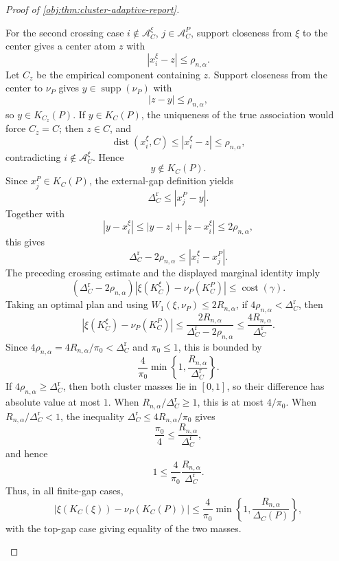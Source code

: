 \begin{proof}[Proof of \cref{obj:thm:cluster-adaptive-report}]
\begin{enumerate}
For the second crossing case \(i\notin\mathscr A_C^\xi\),
\(j\in\mathscr A_C^P\), support closeness from \(\xi\) to the center gives a
center atom \(z\) with
\[
|x_i^\xi-z|\le\rho_{n,\alpha}.
\]
Let \(C_z\) be the empirical component containing \(z\).  Support closeness from
the center to \(\nu_P\) gives \(y\in\operatorname{supp}(\nu_P)\) with
\[
|z-y|\le\rho_{n,\alpha},
\]
so \(y\in K_{C_z}(P)\).  If \(y\in K_C(P)\), the uniqueness of the true
association would force \(C_z=C\); then \(z\in C\), and
\[
\operatorname{dist}(x_i^\xi,C)\le |x_i^\xi-z|\le\rho_{n,\alpha},
\]
contradicting \(i\notin\mathscr A_C^\xi\).  Hence
\[
y\notin K_C(P).
\]
Since \(x_j^P\in K_C(P)\), the external-gap definition yields
\[
\Delta_C^{\mathrm r}\le |x_j^P-y|.
\]
Together with
\[
|y-x_i^\xi|\le |y-z|+|z-x_i^\xi|\le2\rho_{n,\alpha},
\]
this gives
\[
\Delta_C^{\mathrm r}-2\rho_{n,\alpha}
\le |x_i^\xi-x_j^P|.
\]
The preceding crossing estimate and the displayed marginal identity imply
\[
(\Delta_C^{\mathrm r}-2\rho_{n,\alpha})
\left|\xi(K_C^\xi)-\nu_P(K_C^P)\right|
\le
\operatorname{cost}(\gamma).
\]
Taking an optimal plan and using \(W_1(\xi,\nu_P)\le2R_{n,\alpha}\), if
\(4\rho_{n,\alpha}<\Delta_C^{\mathrm r}\), then
\[
\left|\xi(K_C^\xi)-\nu_P(K_C^P)\right|
\le
\frac{2R_{n,\alpha}}{\Delta_C^{\mathrm r}-2\rho_{n,\alpha}}
\le
\frac{4R_{n,\alpha}}{\Delta_C^{\mathrm r}}.
\]
Since \(4\rho_{n,\alpha}=4R_{n,\alpha}/\pi_0<\Delta_C^{\mathrm r}\) and
\(\pi_0\le1\), this is bounded by
\[
\frac{4}{\pi_0}
\min\left\{1,\frac{R_{n,\alpha}}{\Delta_C^{\mathrm r}}\right\}.
\]
If \(4\rho_{n,\alpha}\ge\Delta_C^{\mathrm r}\), then both cluster masses lie in
\([0,1]\), so their difference has absolute value at most \(1\).  When
\(R_{n,\alpha}/\Delta_C^{\mathrm r}\ge1\), this is at most \(4/\pi_0\).  When
\(R_{n,\alpha}/\Delta_C^{\mathrm r}<1\), the inequality
\(\Delta_C^{\mathrm r}\le4R_{n,\alpha}/\pi_0\) gives
\[
\frac{\pi_0}{4}\le\frac{R_{n,\alpha}}{\Delta_C^{\mathrm r}},
\]
and hence
\[
1\le
\frac{4}{\pi_0}\frac{R_{n,\alpha}}{\Delta_C^{\mathrm r}}.
\]
Thus, in all finite-gap cases,
\[
\left|\xi(K_C(\xi))-\nu_P(K_C(P))\right|
\le
\frac{4}{\pi_0}
\min\left\{1,\frac{R_{n,\alpha}}{\Delta_C(P)}\right\},
\]
with the top-gap case giving equality of the two masses. %


\end{enumerate}
\end{proof}

